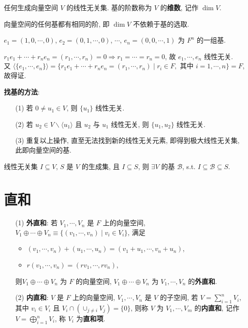 \documentclass{note}
\begin{document}
\begin{df}[基]
    任何生成向量空间 $V$ 的线性无关集. 基的阶数称为 $V$ 的\textbf{维数}, 记作 $\dim V$.
\end{df}

\begin{thm}[(课本定理 1.12)]
    向量空间的任何基都有相同的阶, 即 $\dim V$ 不依赖于基的选取.
\end{thm}

\begin{eg}
    $e_1=(1,0,\cdots,0)$, $e_2=(0,1,\cdots,0)$, $\cdots$, $e_n=(0,0,\cdots,1)$ 为 $F^n$ 的一组基.
\end{eg}
\begin{pf}
    $r_1e_1+\cdots+r_ne_n=(r_1,\cdots,r_n)=0\Longrightarrow r_1=\cdots=r_n=0$, 故 $e_1,\cdots,e_n$ 线性无关.\\
    又 $\langle\{e_1,\cdots,e_n\}\rangle=\{r_1e_1+\cdots+r_ne_n=(r_1,\cdots,r_n)\mid r_i\in F,$ 其中 $i=1,\cdots,n\}=F$, 故得证.
\end{pf}

\textbf{找基的方法}:
\begin{itemize}
    \item[(1)] 若 $0\neq u_1\in V$, 则 $\{u_1\}$ 线性无关.
    \item[(2)] 若 $u_2\in V\backslash\langle u_1\rangle$ 且 $u_2$ 与 $u_1$ 线性无关, 则 $\{u_1,u_2\}$ 线性无关.
    \item[(3)] 重复以上操作, 直至无法找到新的线性无关元素, 即得到极大线性无关集, 此即向量空间的基.
\end{itemize}

\begin{thm}[(课本定理 1.9)]
    线性无关集 $I\subseteq V$, $S$ 是 $V$ 的生成集, 且 $I\subseteq S$, 则 $\exists V$ 的基 $\mathcal{B}$, s.t. $I\subseteq\mathcal{B}\subseteq S$.
\end{thm}

\section{直和}
\begin{df}[直和]
    \begin{itemize}
        \item[(1)] \textbf{外直和}: 若 $V_1,\cdots,V_n$ 是 $F$ 上的向量空间, $V_1\oplus\cdots\oplus V_n\equiv\{(v_1,\cdots,v_n)\mid v_i\in V_i\}$, 满足
        \begin{itemize}
            \item $(v_1,\cdots,v_n)+(u_1,\cdots,u_n)=(v_1+u_1,\cdots,v_n+u_n)$,
            \item $r(v_1,\cdots,v_n)=(rv_1,\cdots,rv_n)$,
        \end{itemize}
        则$V_1\oplus\cdots\oplus V_n$ 为 $F$ 的向量空间, $V_1\oplus\cdots\oplus V_n$ 为 $V_1,\cdots,V_n$ 的\textbf{外直和}.
        \item[(2)] \textbf{内直和}: $V$ 是 $F$ 上的向量空间, $V_1,\cdots,V_n$ 是 $V$ 的子空间, 若 $V=\sum_{i=1}^nV_i$, 其中 $v_i\in V_i$ 且 $V_i\cap(\cup_{j\neq i}V_j)=\{0\}$, 则称 $V$ 为 $V_1,\cdots,V_m$ 的\textbf{内直和}, 记作 $V=\bigoplus_{i=1}^nV_i$, 称 $V_i$ 为\textbf{直和项}.
    \end{itemize}
\end{df}
\end{document}
